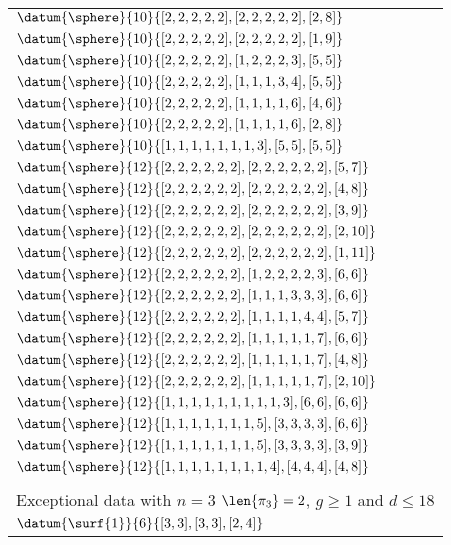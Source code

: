\begin{tabularx}{\mytablewidth}{l}
$\datum{\sphere}{10}{[2, 2, 2, 2, 2],[2, 2, 2, 2, 2],[2, 8]}$\\
$\datum{\sphere}{10}{[2, 2, 2, 2, 2],[2, 2, 2, 2, 2],[1, 9]}$\\
$\datum{\sphere}{10}{[2, 2, 2, 2, 2],[1, 2, 2, 2, 3],[5, 5]}$\\
$\datum{\sphere}{10}{[2, 2, 2, 2, 2],[1, 1, 1, 3, 4],[5, 5]}$\\
$\datum{\sphere}{10}{[2, 2, 2, 2, 2],[1, 1, 1, 1, 6],[4, 6]}$\\
$\datum{\sphere}{10}{[2, 2, 2, 2, 2],[1, 1, 1, 1, 6],[2, 8]}$\\
$\datum{\sphere}{10}{[1, 1, 1, 1, 1, 1, 1, 3],[5, 5],[5, 5]}$\\
$\datum{\sphere}{12}{[2, 2, 2, 2, 2, 2],[2, 2, 2, 2, 2, 2],[5, 7]}$\\
$\datum{\sphere}{12}{[2, 2, 2, 2, 2, 2],[2, 2, 2, 2, 2, 2],[4, 8]}$\\
$\datum{\sphere}{12}{[2, 2, 2, 2, 2, 2],[2, 2, 2, 2, 2, 2],[3, 9]}$\\
$\datum{\sphere}{12}{[2, 2, 2, 2, 2, 2],[2, 2, 2, 2, 2, 2],[2, 10]}$\\
$\datum{\sphere}{12}{[2, 2, 2, 2, 2, 2],[2, 2, 2, 2, 2, 2],[1, 11]}$\\
$\datum{\sphere}{12}{[2, 2, 2, 2, 2, 2],[1, 2, 2, 2, 2, 3],[6, 6]}$\\
$\datum{\sphere}{12}{[2, 2, 2, 2, 2, 2],[1, 1, 1, 3, 3, 3],[6, 6]}$\\
$\datum{\sphere}{12}{[2, 2, 2, 2, 2, 2],[1, 1, 1, 1, 4, 4],[5, 7]}$\\
$\datum{\sphere}{12}{[2, 2, 2, 2, 2, 2],[1, 1, 1, 1, 1, 7],[6, 6]}$\\
$\datum{\sphere}{12}{[2, 2, 2, 2, 2, 2],[1, 1, 1, 1, 1, 7],[4, 8]}$\\
$\datum{\sphere}{12}{[2, 2, 2, 2, 2, 2],[1, 1, 1, 1, 1, 7],[2, 10]}$\\
$\datum{\sphere}{12}{[1, 1, 1, 1, 1, 1, 1, 1, 1, 3],[6, 6],[6, 6]}$\\
$\datum{\sphere}{12}{[1, 1, 1, 1, 1, 1, 1, 5],[3, 3, 3, 3],[6, 6]}$\\
$\datum{\sphere}{12}{[1, 1, 1, 1, 1, 1, 1, 5],[3, 3, 3, 3],[3, 9]}$\\
$\datum{\sphere}{12}{[1, 1, 1, 1, 1, 1, 1, 1, 4],[4, 4, 4],[4, 8]}$\\
\bottomrule\\[1em]
\toprule
\multicolumn{1}{l}{Exceptional data with $n=3$ $\len{\pi_3}=2$, $g\ge 1$ and $d\le 18$}\\
\midrule
$\datum{\surf{1}}{6}{[3, 3],[3, 3],[2, 4]}$\\

\end{tabularx}

